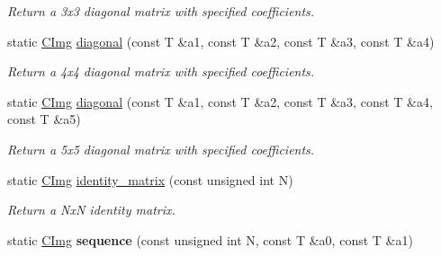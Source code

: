 \begin{DoxyCompactItemize}
\begin{DoxyCompactList}\small\item\em Return a 3x3 diagonal matrix with specified coefficients. \item\end{DoxyCompactList}\item 
\hypertarget{structcimg__library_1_1_c_img_a926edda8629231f547723ad8e1648ce7}{
static \hyperlink{structcimg__library_1_1_c_img}{CImg} \hyperlink{structcimg__library_1_1_c_img_a926edda8629231f547723ad8e1648ce7}{diagonal} (const T \&a1, const T \&a2, const T \&a3, const T \&a4)}
\label{structcimg__library_1_1_c_img_a926edda8629231f547723ad8e1648ce7}

\begin{DoxyCompactList}\small\item\em Return a 4x4 diagonal matrix with specified coefficients. \item\end{DoxyCompactList}\item 
\hypertarget{structcimg__library_1_1_c_img_aa037fdcdbd949bc571e1ef2f20759516}{
static \hyperlink{structcimg__library_1_1_c_img}{CImg} \hyperlink{structcimg__library_1_1_c_img_aa037fdcdbd949bc571e1ef2f20759516}{diagonal} (const T \&a1, const T \&a2, const T \&a3, const T \&a4, const T \&a5)}
\label{structcimg__library_1_1_c_img_aa037fdcdbd949bc571e1ef2f20759516}

\begin{DoxyCompactList}\small\item\em Return a 5x5 diagonal matrix with specified coefficients. \item\end{DoxyCompactList}\item 
\hypertarget{structcimg__library_1_1_c_img_ae413eaa44b87492f8c89ddb7c38603aa}{
static \hyperlink{structcimg__library_1_1_c_img}{CImg} \hyperlink{structcimg__library_1_1_c_img_ae413eaa44b87492f8c89ddb7c38603aa}{identity\_\-matrix} (const unsigned int N)}
\label{structcimg__library_1_1_c_img_ae413eaa44b87492f8c89ddb7c38603aa}

\begin{DoxyCompactList}\small\item\em Return a NxN identity matrix. \item\end{DoxyCompactList}\item 
\hypertarget{structcimg__library_1_1_c_img_a9fcc2fb6dc5a7629dc2558adceb474b3}{
static \hyperlink{structcimg__library_1_1_c_img}{CImg} {\bfseries sequence} (const unsigned int N, const T \&a0, const T \&a1)}
\label{structcimg__library_1_1_c_img_a9fcc2fb6dc5a7629dc2558adceb474b3}


\end{DoxyCompactItemize}
